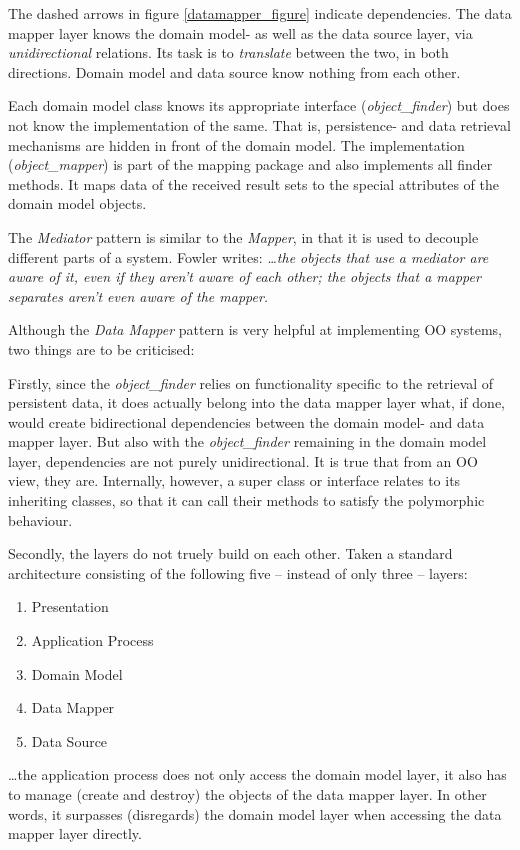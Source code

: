 The dashed arrows in figure \ref{datamapper_figure} indicate dependencies. The
data mapper layer knows the domain model- as well as the data source layer, via
\emph{unidirectional} relations. Its task is to \emph{translate} between the two,
in both directions. Domain model and data source know nothing from each other.

Each domain model class knows its appropriate interface (\emph{object\_finder})
but does not know the implementation of the same. That is, persistence- and
data retrieval mechanisms are hidden in front of the domain model. The
implementation (\emph{object\_mapper}) is part of the mapping package and also
implements all finder methods. It maps data of the received result sets to the
special attributes of the domain model objects.

The \emph{Mediator} pattern \cite{gamma1995} is similar to the \emph{Mapper}, in
that it is used to decouple different parts of a system. Fowler \cite{fowler2002}
writes: \textit{\ldots the objects that use a mediator are aware of it, even if
they aren't aware of each other; the objects that a mapper separates aren't even
aware of the mapper.}

Although the \emph{Data Mapper} pattern is very helpful at implementing OO
systems, two things are to be criticised:

Firstly, since the \emph{object\_finder} relies on functionality specific to the
retrieval of persistent data, it does actually belong into the data mapper layer
what, if done, would create bidirectional dependencies between the domain model-
and data mapper layer. But also with the \emph{object\_finder} remaining in the
domain model layer, dependencies are not purely unidirectional. It is true that
from an OO view, they are. Internally, however, a super class or interface
relates to its inheriting classes, so that it can call their methods to satisfy
the polymorphic behaviour.

Secondly, the layers do not truely build on each other. Taken a standard
architecture consisting of the following five -- instead of only three -- layers:

\begin{enumerate}
    \item Presentation
    \item Application Process
    \item Domain Model
    \item Data Mapper
    \item Data Source
\end{enumerate}

\ldots the application process does not only access the domain model layer, it
also has to manage (create and destroy) the objects of the data mapper layer.
In other words, it surpasses (disregards) the domain model layer when accessing
the data mapper layer directly.
